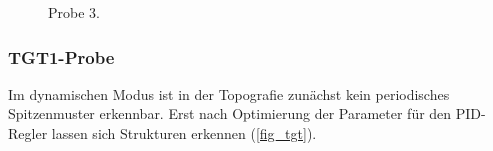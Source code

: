 \documentclass[
	a4paper,
	12pt,
	pagesize,
	ngerman
]{scrartcl}
\begin{document}
\begin{figure}[H]
			\caption{Probe 3.}
			\label{fig_br}
\end{figure}

\subsubsection{TGT1-Probe}

Im dynamischen Modus ist in der Topografie zunächst kein periodisches Spitzenmuster erkennbar.
Erst nach Optimierung der Parameter für den PID-Regler lassen sich Strukturen erkennen (\cref{fig_tgt}).
\end{document}
